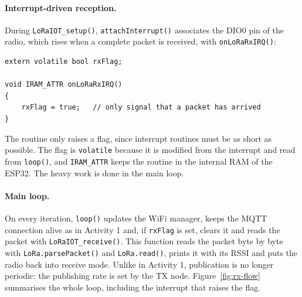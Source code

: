 \documentclass[informe,english]{plantilla}
\begin{document}
\paragraph{Interrupt-driven reception.} During \texttt{LoRaIOT\_setup()}, \texttt{attachInterrupt()} associates the DIO0 pin of the radio, which rises when a complete packet is received, with \texttt{onLoRaRxIRQ()}:

\begin{lstlisting}[style=arduino]
extern volatile bool rxFlag;

void IRAM_ATTR onLoRaRxIRQ()
{
    rxFlag = true;   // only signal that a packet has arrived
}
\end{lstlisting}

The routine only raises a flag, since interrupt routines must be as short as possible. The flag is \texttt{volatile} because it is modified from the interrupt and read from \texttt{loop()}, and \texttt{IRAM\_ATTR} keeps the routine in the internal RAM of the ESP32. The heavy work is done in the main loop.

\paragraph{Main loop.} On every iteration, \texttt{loop()} updates the WiFi manager, keeps the MQTT connection alive as in Activity 1 and, if \texttt{rxFlag} is set, clears it and reads the packet with \texttt{LoRaIOT\_receive()}. This function reads the packet byte by byte with \texttt{LoRa.parsePacket()} and \texttt{LoRa.read()}, prints it with its RSSI and puts the radio back into receive mode. Unlike in Activity 1, publication is no longer periodic: the publishing rate is set by the TX node. Figure~\ref{fig:rx-flow} summarises the whole loop, including the interrupt that raises the flag.
\end{document}
